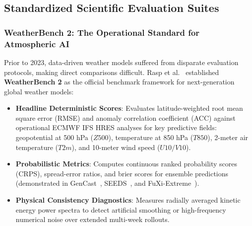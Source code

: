 \subsection{Standardized Scientific Evaluation Suites}

\subsubsection{WeatherBench 2: The Operational Standard for Atmospheric AI}
Prior to 2023, data-driven weather models suffered from disparate evaluation protocols, making direct comparisons difficult. Rasp et al.~\cite{rasp2024weatherbench2} established \textbf{WeatherBench 2} as the official benchmark framework for next-generation global weather models:
\begin{itemize}
    \item \textbf{Headline Deterministic Scores}: Evaluates latitude-weighted root mean square error (RMSE) and anomaly correlation coefficient (ACC) against operational ECMWF IFS HRES analyses for key predictive fields: geopotential at 500 hPa ($Z500$), temperature at 850 hPa ($T850$), 2-meter air temperature ($T2m$), and 10-meter wind speed ($U10/V10$).
    \item \textbf{Probabilistic Metrics}: Computes continuous ranked probability scores (CRPS), spread-error ratios, and brier scores for ensemble predictions (demonstrated in GenCast~\cite{price2023gencast}, SEEDS~\cite{li2024seeds}, and FuXi-Extreme~\cite{chen2023fuxiextreme}).
    \item \textbf{Physical Consistency Diagnostics}: Measures radially averaged kinetic energy power spectra to detect artificial smoothing or high-frequency numerical noise over extended multi-week rollouts.
\end{itemize}

